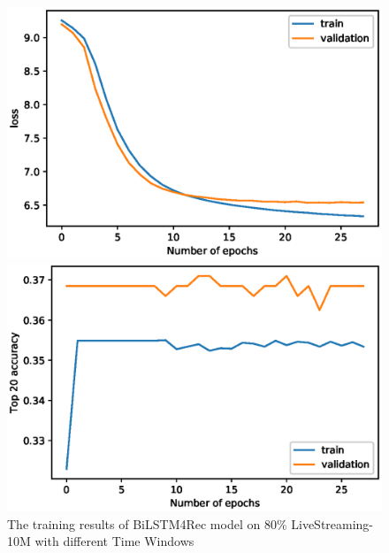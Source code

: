 \documentclass[runningheads]{llncs}
\begin{document}
\begin{figure}[!htb]
   \begin{minipage}{0.48\textwidth}
     \centering
     \includegraphics[width=\linewidth]{image/model_loss.eps}
   \end{minipage}\hfill
   \begin {minipage}{0.48\textwidth}
     \centering
     \includegraphics[width=\linewidth]{image/Top_20_accuracy.eps}
   \end{minipage}
   \caption{The training results of BiLSTM4Rec model on 80\% LiveStreaming-10M with different Time Windows}
\end{figure}

\end{document}
